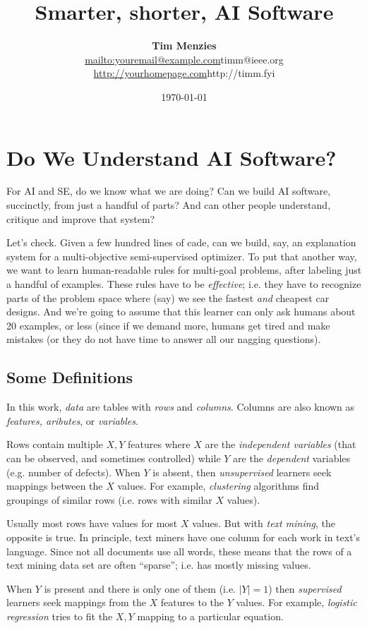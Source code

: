 \documentclass[twocolumn,landscape,9pt]{book}
\title{Smarter, shorter, AI Software}
\author{{\bf Tim Menzies}\\ \url{mailto:youremail@example.com}{timm@ieee.org} \\ \url{http://yourhomepage.com}{http://timm.fyi}}
\date{\today}
\begin{document}
\maketitle
\tableofcontents
\small

\chapter{Do We Understand AI Software?}
For AI and SE, do we know what we are doing? 
Can we build AI software, succinctly, from just a handful of parts? And can other people
understand, critique and improve that system?

Let's check. Given a few hundred lines of cade,
can we build, say, an explanation system for a multi-objective semi-supervised optimizer.
To put that another way,
we want to learn human-readable rules for multi-goal problems, after labeling just a handful of examples.
    These  rules have to  be {\em effective}; i.e. they have to  recognize  parts of the problem space where (say) we see the fastest {\em and} cheapest car designs.
And we're going to assume that this learner can only ask humans about 20 examples, or less
(since if we demand more,
    humans get tired and make mistakes  (or they do not have time to answer all our nagging questions).

\section{Some Definitions}

In this work,
{\em data} are tables with {\em rows} and {\em columns}.
Columns are also known as
{\em features, aributes}, or
{\em variables}.

Rows contain multiple $X,Y$ features where $X$ are the  {\em independent variables} (that can be observed, and sometimes controlled) while $Y$ are the {\em dependent} variables (e.g. number of defects). When $Y$ is absent,  then {\em unsupervised}  learners seek mappings
between the $X$ values. For example,
{\em clustering} algorithms find groupings of similar rows (i.e. rows with similar $X$ values).

Usually most rows have values for most $X$ values. But with {\em text mining}, the opposite is true. In principle, text miners have one column 
for each work in text's language. Since not all documents use all words, these means that the rows of a text mining data set are often ``sparse''; 
i.e. has mostly missing values.


When $Y$ is present and there is only one of them (i.e. $|Y|=1$) then {\em supervised} learners seek mappings from the $X$ features to the $Y$ values. For example,
{\em logistic regression} tries to fit the $X,Y$ mapping to a particular equation. 
\end{document}
